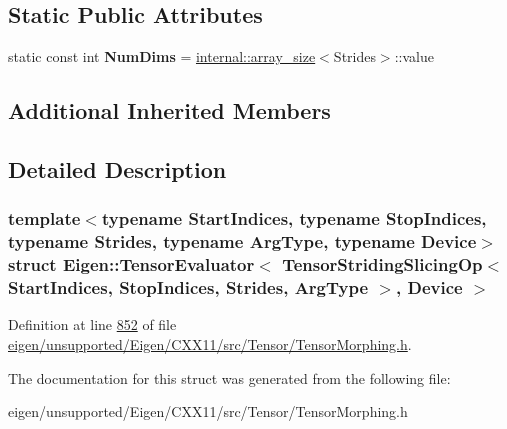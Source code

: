 \subsection*{Static Public Attributes}
\begin{DoxyCompactItemize}
\item 
\mbox{\label{struct_eigen_1_1_tensor_evaluator_3_01_tensor_striding_slicing_op_3_01_start_indices_00_01_stop_b19fd6c14958f7e749ce3c389a8eda72_a173efddc7e601a23b7bcc44e9a9e0b04}} 
static const int {\bfseries Num\+Dims} = \hyperlink{struct_eigen_1_1internal_1_1array__size}{internal\+::array\+\_\+size}$<$Strides$>$\+::value
\end{DoxyCompactItemize}
\subsection*{Additional Inherited Members}


\subsection{Detailed Description}
\subsubsection*{template$<$typename Start\+Indices, typename Stop\+Indices, typename Strides, typename Arg\+Type, typename Device$>$\newline
struct Eigen\+::\+Tensor\+Evaluator$<$ Tensor\+Striding\+Slicing\+Op$<$ Start\+Indices, Stop\+Indices, Strides, Arg\+Type $>$, Device $>$}



Definition at line \hyperlink{eigen_2unsupported_2_eigen_2_c_x_x11_2src_2_tensor_2_tensor_morphing_8h_source_l00852}{852} of file \hyperlink{eigen_2unsupported_2_eigen_2_c_x_x11_2src_2_tensor_2_tensor_morphing_8h_source}{eigen/unsupported/\+Eigen/\+C\+X\+X11/src/\+Tensor/\+Tensor\+Morphing.\+h}.



The documentation for this struct was generated from the following file\+:\begin{DoxyCompactItemize}
\item 
eigen/unsupported/\+Eigen/\+C\+X\+X11/src/\+Tensor/\+Tensor\+Morphing.\+h\end{DoxyCompactItemize}
